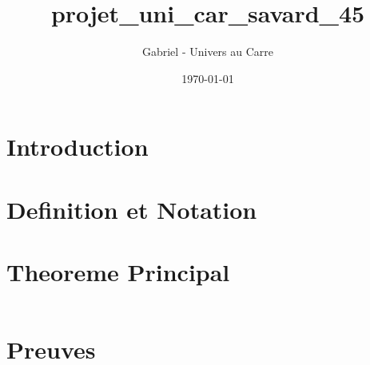 \documentclass[12pt]{article}
\title{projet_uni_car_savard_45}
\author{Gabriel - Univers au Carre}
\date{\today}
\begin{document}
\maketitle


\section{Introduction}



\section{Definition et Notation}



\section{Theoreme Principal}


\begin{equation}
\end{equation}


\section{Preuves}


\end{document}

